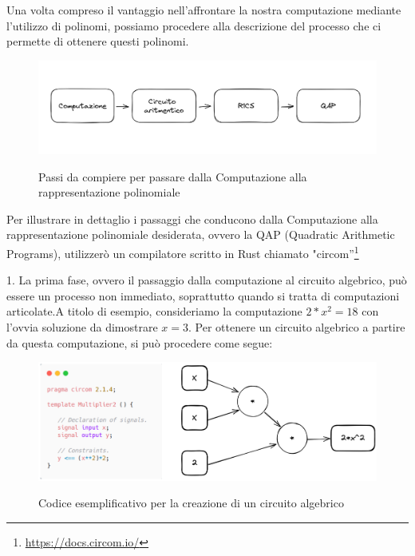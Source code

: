 Una volta compreso il vantaggio nell'affrontare la nostra computazione mediante l'utilizzo di polinomi, possiamo
procedere alla descrizione del processo che ci permette di ottenere questi polinomi.

\begin{figure}[H]
    \centering
    \includegraphics[width=15cm]{./chapters/1.state-of-art/images/8.comp_qap.png}
    \label{fig:comp-qap}
    \captionsetup{justification=centering}
    \caption{Passi da compiere per passare dalla Computazione alla rappresentazione polinomiale}
\end{figure}

Per illustrare in dettaglio i passaggi che conducono dalla Computazione alla rappresentazione polinomiale desiderata,
ovvero la QAP (Quadratic Arithmetic Programs), utilizzerò un compilatore scritto in Rust chiamato "circom”\footnote{\url{https://docs.circom.io/}}

1. La prima fase, ovvero il passaggio dalla computazione al circuito algebrico, può essere un processo non immediato,
soprattutto quando si tratta di computazioni articolate.A titolo di esempio, consideriamo la computazione $2*x^2=18$ con
l'ovvia soluzione da dimostrare $x=3$. Per ottenere un circuito algebrico a partire da questa computazione, si può
procedere come segue:
    
\begin{figure}[H]
    \centering
    \includegraphics[width=13cm]{./chapters/1.state-of-art/images/9.comp_circ.png}
    \label{fig:comp-circ}
    \captionsetup{justification=centering}
    \caption{Codice esemplificativo per la creazione di un circuito algebrico}
\end{figure}
    
